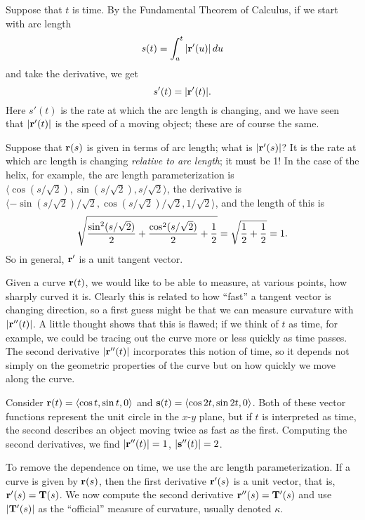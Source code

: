 Suppose that $t$ is time.
By the Fundamental Theorem of Calculus, if we start with
arc length
$$s(t)=\int_a^t |{\bf r}'(u)|\,du$$
and take the derivative, we get
$$s'(t)=|{\bf r}'(t)|.$$
Here $s'(t)$ is the rate at which the arc length is changing, and
we have seen that $|{\bf r}'(t)|$ is the speed of a moving object;
these are of course the same.

Suppose that ${\bf r}(s)$ is given in terms of arc length; what is
$|{\bf r}'(s)|$? It is the rate at which arc length is changing {\it
  relative to arc length}; it must be 1! In the case of the helix, for
example, the arc length parameterization is $\langle
\cos(s/\sqrt2),\sin(s/\sqrt2),s/\sqrt2\rangle$, the derivative is
$\langle -\sin(s/\sqrt2)/\sqrt2,\cos(s/\sqrt2)/\sqrt2,1/\sqrt2\rangle$,
and the length of this is
$$\sqrt{{\sin^2(s/\sqrt2)\over2}+{\cos^2(s/\sqrt2)\over2}+{1\over2}}=
\sqrt{{1\over2}+{1\over2}}=1.$$
So in general, ${\bf r}'$ is a unit tangent vector.

Given a curve ${\bf r}(t)$, we would like to be able to measure, at
various points, how sharply curved it is. Clearly this is related to
how ``fast'' a tangent vector is changing direction, so a first guess
might be that we can measure curvature with $|{\bf r}''(t)|$. A little
thought shows that this is flawed; if we think of $t$ as time, for
example, we could be tracing out the curve more or less quickly
as time passes. The second derivative $|{\bf r}''(t)|$ incorporates
this notion of time, so it depends not simply on the geometric
properties of the curve but on how quickly we move along the curve.

\begin{example} Consider ${\bf r}(t)=\langle \cos t,\sin t,0\rangle$ and 
${\bf s}(t)=\langle \cos 2t,\sin 2t,0\rangle$. Both of these vector
functions represent the unit circle in the $x$-$y$ plane, but if $t$
is interpreted as time, the second describes an object moving twice as
fast as the first. Computing the second derivatives, we find
$|{\bf r}''(t)|=1$, $|{\bf s}''(t)|=2$.
\end{example}

To remove the dependence on time, we use the arc length
parameterization. If a curve is given by ${\bf r}(s)$, then the first
derivative ${\bf r}'(s)$ is a unit vector, that is, 
${\bf r}'(s)={\bf T}(s)$. We now compute the second derivative
${\bf r}''(s)={\bf T}'(s)$ and use  $|{\bf T}'(s)|$ as the
``official'' measure of 
{\dfont curvature}, usually denoted $\kappa$.

